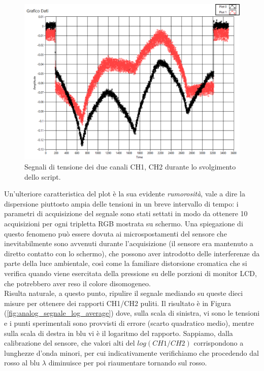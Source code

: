 \documentclass[10pt,letterpaper]{article}
\begin{document}
\begin{figure}
\centering
\includegraphics[width=0.7\linewidth]{./analog_monitor_colori}
\caption{Segnali di tensione dei due canali CH1, CH2 durante lo svolgimento dello script.}
\label{fig:analog_monitor_colori}
\end{figure}


Un'ulteriore caratteristica del plot è la sua evidente \textit{rumorosità}, vale a dire la dispersione piuttosto ampia delle tensioni in un breve intervallo di tempo: i parametri di acquisizione del segnale sono stati settati in modo da ottenere 10 acquisizioni per ogni tripletta RGB mostrata su schermo. Una spiegazione di questo fenomeno può essere dovuta ai microspostamenti del sensore che inevitabilmente sono avvenuti durante l'acquisizione (il sensore era mantenuto a diretto contatto con lo schermo), che possono aver introdotto delle interferenze da parte della luce ambientale, così come la familiare distorsione cromatica che si verifica quando viene esercitata della pressione su delle porzioni di monitor LCD, che potrebbero aver reso il colore disomogeneo.\\



Risulta naturale, a questo punto, ripulire il segnale mediando su queste dieci misure per ottenere dei rapporti CH1/CH2 puliti. Il risultato è in Figura (\ref{fig:analog_segnale_log_average}) dove, sulla scala di sinistra, vi sono le tensioni e i punti sperimentali sono provvisti di errore (scarto quadratico medio), mentre sulla scala di destra in blu vi è il logaritmo del rapporto. Sappiamo, dalla calibrazione del sensore, che valori alti del $log(CH1/CH2)$ corrispondono a lunghezze d'onda minori, per cui indicativamente verifichiamo che procedendo dal rosso al blu $\lambda$ diminuisce per poi riaumentare tornando sul rosso.\\
\end{document}
